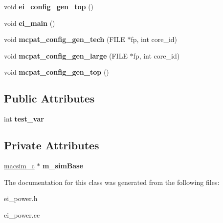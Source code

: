 \begin{DoxyCompactItemize}
\item 
\hypertarget{classei__power__c_a6399e067654e5a58b72d41378083200c}{
void {\bfseries ei\_\-config\_\-gen\_\-top} ()}
\label{classei__power__c_a6399e067654e5a58b72d41378083200c}

\item 
\hypertarget{classei__power__c_ac467ad8c687701c905313e6c858a53e6}{
void {\bfseries ei\_\-main} ()}
\label{classei__power__c_ac467ad8c687701c905313e6c858a53e6}

\item 
\hypertarget{classei__power__c_a959a30f7f5c094989e0139dcf3e10990}{
void {\bfseries mcpat\_\-config\_\-gen\_\-tech} (FILE $\ast$fp, int core\_\-id)}
\label{classei__power__c_a959a30f7f5c094989e0139dcf3e10990}

\item 
\hypertarget{classei__power__c_ab5ccd005894a5f64518ee5595f730cf1}{
void {\bfseries mcpat\_\-config\_\-gen\_\-large} (FILE $\ast$fp, int core\_\-id)}
\label{classei__power__c_ab5ccd005894a5f64518ee5595f730cf1}

\item 
\hypertarget{classei__power__c_ab4f0875d3a7eef291daffae22f1c375e}{
void {\bfseries mcpat\_\-config\_\-gen\_\-top} ()}
\label{classei__power__c_ab4f0875d3a7eef291daffae22f1c375e}

\end{DoxyCompactItemize}
\subsection*{Public Attributes}
\begin{DoxyCompactItemize}
\item 
\hypertarget{classei__power__c_ab1484ed87154735f980e8581fa337011}{
int {\bfseries test\_\-var}}
\label{classei__power__c_ab1484ed87154735f980e8581fa337011}

\end{DoxyCompactItemize}
\subsection*{Private Attributes}
\begin{DoxyCompactItemize}
\item 
\hypertarget{classei__power__c_adaeff9378f66cb5c7945befb919c1cae}{
\hyperlink{classmacsim__c}{macsim\_\-c} $\ast$ {\bfseries m\_\-simBase}}
\label{classei__power__c_adaeff9378f66cb5c7945befb919c1cae}

\end{DoxyCompactItemize}


The documentation for this class was generated from the following files:\begin{DoxyCompactItemize}
\item 
ei\_\-power.h\item 
ei\_\-power.cc\end{DoxyCompactItemize}
